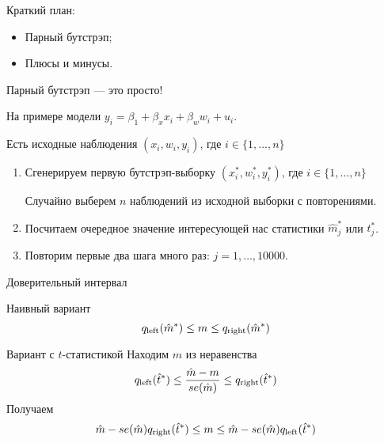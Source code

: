 
\begin{frame} %


\end{frame}



\begin{frame}{Краткий план:}
  \begin{itemize}[<+->]
    \item Парный бутстрэп;
    \item Плюсы и минусы.
  \end{itemize}

\end{frame}


\begin{frame}{Парный бутстрэп — это просто!}

На примере модели $y_i = \beta_1 + \beta_x x_i + \beta_w w_i + u_i$.

Есть исходные наблюдения $(x_i, w_i, y_i)$, где $i \in \{1, \ldots, n\}$

\begin{enumerate}[<+->]
    \item Сгенерируем первую бутстрэп-выборку $(x^*_i, w^*_i, y^*_i)$, где $i \in \{1, \ldots, n\}$
    
    Случайно выберем $n$ наблюдений из исходной выборки с повторениями.
    \item Посчитаем очередное значение интересующей нас статистики $\hat m^*_j$ или $t^*_j$.
    \item Повторим первые два шага много раз: $j = 1, \ldots, 10000$.
\end{enumerate}
\end{frame}

\begin{frame}{Доверительный интервал}

\begin{block}{Наивный вариант}
\[
q_{\text{left}}(\hat m^*) \leq m \leq q_{\text{right}}(\hat m^*)
\]
\end{block}

\begin{block}{Вариант с $t$-статистикой}
Находим $m$ из неравенства
\[
q_{\text{left}}(\hat t^*) \leq \frac{\hat m - m}{se(\hat m)} \leq q_{\text{right}}(\hat t^*)    
\]
Получаем 
\[
\hat m  - se(\hat m) q_{\text{right}}(\hat t^*) \leq m \leq \hat m - se(\hat m) q_{\text{left}}(\hat t^*)      
\]
\end{block}


\end{frame}

